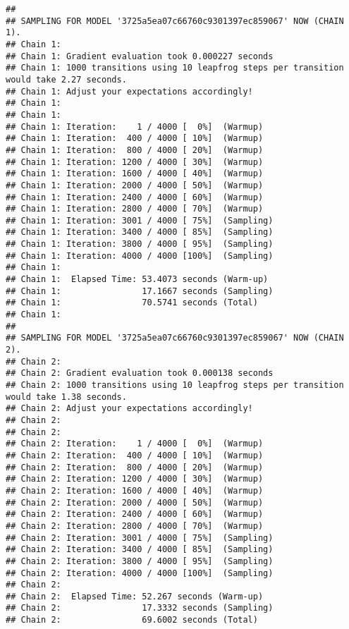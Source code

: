 \documentclass{article}\usepackage[]{graphicx}\usepackage[]{color}
\makeatletter
\newenvironment{kframe}{%
 \def\at@end@of@kframe{}%
 \ifinner\ifhmode%
  \def\at@end@of@kframe{\end{minipage}}%
  \begin{minipage}{\columnwidth}%
 \fi\fi%
 \def\FrameCommand##1{\hskip\@totalleftmargin \hskip-\fboxsep
 \colorbox{shadecolor}{##1}\hskip-\fboxsep
     \hskip-\linewidth \hskip-\@totalleftmargin \hskip\columnwidth}%
 \MakeFramed {\advance\hsize-\width
   \@totalleftmargin\z@ \linewidth\hsize
   \@setminipage}}%
 {\par\unskip\endMakeFramed%
 \at@end@of@kframe}
\newenvironment{knitrout}{}{} %
\makeatother
\begin{document}
\begin{knitrout}
\begin{kframe}
{\ttfamily\noindent\color{warningcolor}{\#\# Warning: Rows containing NAs were excluded from the model.}}

{\ttfamily\noindent\itshape\color{messagecolor}{\#\# Compiling the C++ model}}

{\ttfamily\noindent\itshape\color{messagecolor}{\#\# Start sampling}}\begin{verbatim}
## 
## SAMPLING FOR MODEL '3725a5ea07c66760c9301397ec859067' NOW (CHAIN 1).
## Chain 1: 
## Chain 1: Gradient evaluation took 0.000227 seconds
## Chain 1: 1000 transitions using 10 leapfrog steps per transition would take 2.27 seconds.
## Chain 1: Adjust your expectations accordingly!
## Chain 1: 
## Chain 1: 
## Chain 1: Iteration:    1 / 4000 [  0%]  (Warmup)
## Chain 1: Iteration:  400 / 4000 [ 10%]  (Warmup)
## Chain 1: Iteration:  800 / 4000 [ 20%]  (Warmup)
## Chain 1: Iteration: 1200 / 4000 [ 30%]  (Warmup)
## Chain 1: Iteration: 1600 / 4000 [ 40%]  (Warmup)
## Chain 1: Iteration: 2000 / 4000 [ 50%]  (Warmup)
## Chain 1: Iteration: 2400 / 4000 [ 60%]  (Warmup)
## Chain 1: Iteration: 2800 / 4000 [ 70%]  (Warmup)
## Chain 1: Iteration: 3001 / 4000 [ 75%]  (Sampling)
## Chain 1: Iteration: 3400 / 4000 [ 85%]  (Sampling)
## Chain 1: Iteration: 3800 / 4000 [ 95%]  (Sampling)
## Chain 1: Iteration: 4000 / 4000 [100%]  (Sampling)
## Chain 1: 
## Chain 1:  Elapsed Time: 53.4073 seconds (Warm-up)
## Chain 1:                17.1667 seconds (Sampling)
## Chain 1:                70.5741 seconds (Total)
## Chain 1: 
## 
## SAMPLING FOR MODEL '3725a5ea07c66760c9301397ec859067' NOW (CHAIN 2).
## Chain 2: 
## Chain 2: Gradient evaluation took 0.000138 seconds
## Chain 2: 1000 transitions using 10 leapfrog steps per transition would take 1.38 seconds.
## Chain 2: Adjust your expectations accordingly!
## Chain 2: 
## Chain 2: 
## Chain 2: Iteration:    1 / 4000 [  0%]  (Warmup)
## Chain 2: Iteration:  400 / 4000 [ 10%]  (Warmup)
## Chain 2: Iteration:  800 / 4000 [ 20%]  (Warmup)
## Chain 2: Iteration: 1200 / 4000 [ 30%]  (Warmup)
## Chain 2: Iteration: 1600 / 4000 [ 40%]  (Warmup)
## Chain 2: Iteration: 2000 / 4000 [ 50%]  (Warmup)
## Chain 2: Iteration: 2400 / 4000 [ 60%]  (Warmup)
## Chain 2: Iteration: 2800 / 4000 [ 70%]  (Warmup)
## Chain 2: Iteration: 3001 / 4000 [ 75%]  (Sampling)
## Chain 2: Iteration: 3400 / 4000 [ 85%]  (Sampling)
## Chain 2: Iteration: 3800 / 4000 [ 95%]  (Sampling)
## Chain 2: Iteration: 4000 / 4000 [100%]  (Sampling)
## Chain 2: 
## Chain 2:  Elapsed Time: 52.267 seconds (Warm-up)
## Chain 2:                17.3332 seconds (Sampling)
## Chain 2:                69.6002 seconds (Total)

\end{verbatim}
\end{kframe}
\end{knitrout}
\end{document}
